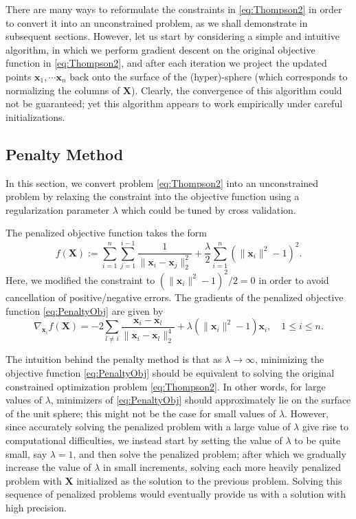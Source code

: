 \documentclass[11pt]{article}
\begin{document}
There are many ways to reformulate the constraints in \eqref{eq:Thompson2} in order to convert it into an unconstrained problem, as we shall demonstrate in subsequent sections.
However, let us start by considering a simple and intuitive algorithm, in which we perform gradient descent on the original objective function in \eqref{eq:Thompson2}, and after each iteration we project the updated points $\bm{x}_1,\cdots\bm{x}_n$ back onto the surface of the (hyper)-sphere (which corresponds to normalizing the columns of $\bm{X}$).
Clearly, the convergence of this algorithm could not be guaranteed; yet this algorithm appears to work empirically under careful initializations.


\subsection{Penalty Method}

In this section, we convert problem \eqref{eq:Thompson2} into an unconstrained problem by relaxing the constraint into the objective function using a regularization parameter $\lambda$ which could be tuned by cross validation.

The penalized objective function takes the form
\begin{equation}\label{eq:PenaltyObj}
f(\bm{X}) := \sum_{i=1}^n\sum_{j=1}^{i-1}\frac{1}{\|\bm{x}_i-\bm{x}_j\|_2^2} + \frac{\lambda}{2} \sum_{i=1}^n \left(\|\bm{x}_i\|^2-1\right)^2.
\end{equation}
Here, we modified the constraint to $(\|\bm{x}_i\|^2-1)^2/2=0$ in order to avoid cancellation of positive/negative errors.
The gradients of the penalized objective function \eqref{eq:PenaltyObj} are given by
\begin{equation}
\nabla_{\bm{x}_i} f(\bm{X}) = -2\sum_{l\neq i} \frac{\bm{x}_i-\bm{x}_l}{\|\bm{x}_i-\bm{x}_l\|_2^4} + \lambda\left(\|\bm{x}_i\|^2-1\right)\bm{x}_i, \quad 1\le i\le n.
\end{equation}

The intuition behind the penalty method is that as $\lambda\to\infty$, minimizing the objective function \eqref{eq:PenaltyObj} should be equivalent to solving the original constrained optimization problem \eqref{eq:Thompson2}. In other words, for large values of $\lambda$, minimizers of \eqref{eq:PenaltyObj} should approximately lie on the surface of the unit sphere; this might not be the case for small values of $\lambda$. However, since accurately solving the penalized problem with a large value of $\lambda$ give rise to computational difficulties, we instead start by setting the value of $\lambda$ to be quite small, say $\lambda=1$, and then solve the penalized problem; after which we gradually increase the value of $\lambda$ in small increments, solving each more heavily penalized problem with $\bm{X}$ initialized as the solution to the previous problem. Solving this sequence of penalized problems would eventually provide us with a solution with high precision.
\end{document}
